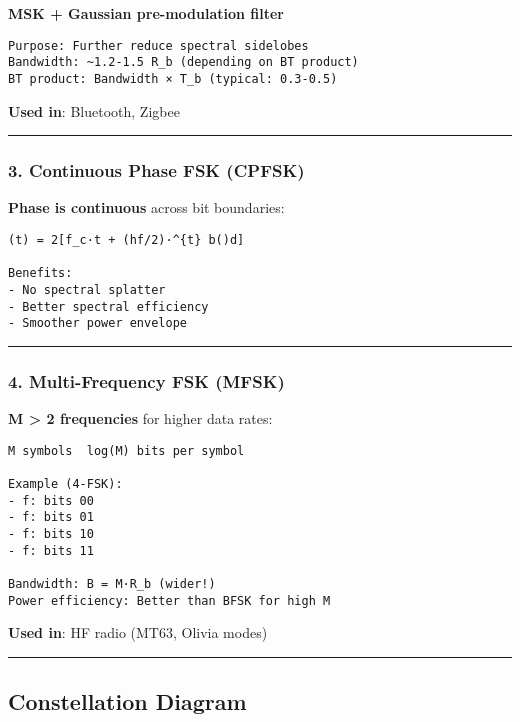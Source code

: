 \textbf{MSK + Gaussian pre-modulation filter}

\begin{verbatim}
Purpose: Further reduce spectral sidelobes
Bandwidth: ~1.2-1.5 R_b (depending on BT product)
BT product: Bandwidth × T_b (typical: 0.3-0.5)
\end{verbatim}

\textbf{Used in}: Bluetooth, Zigbee

\begin{center}\rule{0.5\linewidth}{0.5pt}\end{center}

\subsubsection{3. Continuous Phase FSK
(CPFSK)}\label{continuous-phase-fsk-cpfsk}

\textbf{Phase is continuous} across bit boundaries:

\begin{verbatim}
(t) = 2[f_c·t + (hf/2)·^{t} b()d]

Benefits:
- No spectral splatter
- Better spectral efficiency
- Smoother power envelope
\end{verbatim}

\begin{center}\rule{0.5\linewidth}{0.5pt}\end{center}

\subsubsection{4. Multi-Frequency FSK
(MFSK)}\label{multi-frequency-fsk-mfsk}

\textbf{M \textgreater{} 2 frequencies} for higher data rates:

\begin{verbatim}
M symbols  log(M) bits per symbol

Example (4-FSK):
- f: bits 00
- f: bits 01
- f: bits 10
- f: bits 11

Bandwidth: B = M·R_b (wider!)
Power efficiency: Better than BFSK for high M
\end{verbatim}

\textbf{Used in}: HF radio (MT63, Olivia modes)

\begin{center}\rule{0.5\linewidth}{0.5pt}\end{center}

\subsection{\texorpdfstring{ Constellation
Diagram}{ Constellation Diagram}}\label{constellation-diagram}

